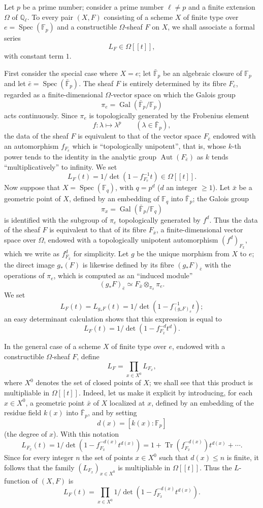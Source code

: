 \documentclass[11pt]{article}
\DeclareMathOperator{\Spec}{Spec}
\providecommand{\Gal}{\operatorname{Gal}}
\providecommand{\Tr}{\operatorname{Tr}}
\providecommand{\Tr}{\operatorname{Tr}}
\providecommand{\Tr}{\operatorname{Tr}}
\providecommand{\Aut}{\operatorname{Aut}}
\providecommand{\Tr}{\operatorname{Tr}}
\providecommand{\Spec}{\operatorname{Spec}}
\providecommand{\Spec}{\operatorname{Spec}}
\providecommand{\Aut}{\operatorname{Aut}}
\providecommand{\Spec}{\operatorname{Spec}}
\providecommand{\Tr}{\operatorname{Tr}}
\providecommand{\Spec}{\operatorname{Spec}}
\providecommand{\Gal}{\operatorname{Gal}}
\begin{document}
Let $p$ be a prime number; consider a prime number $\ell\ne p$ and a finite extension $\Omega$ of $\mathbb Q_\ell$. To every pair $(X,F)$ consisting of a scheme $X$ of finite type over $e=\Spec(\mathbb F_p)$ and a constructible $\Omega$-sheaf $F$ on $X$, we shall associate a formal series
\[
L_F\in\Omega[[t]],
\]
with constant term $1$.


First consider the special case where $X=e$; let $\bar{\mathbb F}_p$ be an algebraic closure of $\mathbb F_p$ and let $\bar e=\Spec(\bar{\mathbb F}_p)$. The sheaf $F$ is entirely determined by its fibre $F_{\bar e}$, regarded as a finite-dimensional $\Omega$-vector space on which the Galois group
\[
\pi_e=\Gal(\bar{\mathbb F}_p/\mathbb F_p)
\]
acts continuously. Since $\pi_e$ is topologically generated by the Frobenius element
\[
f:\lambda\longmapsto\lambda^p\qquad(\lambda\in\bar{\mathbb F}_p),
\]
the data of the sheaf $F$ is equivalent to that of the vector space $F_{\bar e}$ endowed with an automorphism $f_{F_{\bar e}}$ which is ``topologically unipotent'', that is, whose $k$-th power tends to the identity in the analytic group $\Aut(F_{\bar e})$ as $k$ tends ``multiplicatively'' to infinity. We set
\[
L_F(t)=1/\det(1-f_{F_{\bar e}}^{-1}t)\in\Omega[[t]].
\]
Now suppose that $X=\Spec(\mathbb F_q)$, with $q=p^d$ ($d$ an integer $\ge1$). Let $\bar x$ be a geometric point of $X$, defined by an embedding of $\mathbb F_q$ into $\bar{\mathbb F}_p$; the Galois group
\[
\pi_x=\Gal(\bar{\mathbb F}_p/\mathbb F_q)
\]
is identified with the subgroup of $\pi_e$ topologically generated by $f^d$. Thus the data of the sheaf $F$ is equivalent to that of its fibre $F_{\bar x}$, a finite-dimensional vector space over $\Omega$, endowed with a topologically unipotent automorphism $(f^d)_{F_{\bar x}}$, which we write as $f^d_{F_{\bar x}}$ for simplicity. Let $g$ be the unique morphism from $X$ to $e$; the direct image $g_*(F)$ is likewise defined by its fibre $(g_*F)_{\bar e}$ with the operations of $\pi_e$, which is computed as an ``induced module''
\[
(g_*F)_{\bar e}\simeq F_{\bar x}\otimes_{\pi_x}\pi_e.
\]
We set
\[
L_F(t)=L_{g_*F}(t)=1/\det(1-f^{-1}_{(g_*F)_{\bar e}}t);
\]
an easy determinant calculation shows that this expression is equal to
\[
L_F(t)=1/\det(1-f^{-d}_{F_{\bar x}}t^d).
\]

In the general case of a scheme $X$ of finite type over $e$, endowed with a constructible $\Omega$-sheaf $F$, define
\[
L_F=\prod_{x\in X^0}L_{F_x},
\]
where $X^0$ denotes the set of closed points of $X$; we shall see that this product is multipliable in $\Omega[[t]]$. Indeed, let us make it explicit by introducing, for each $x\in X^0$, a geometric point $\bar x$ of $X$ localized at $x$, defined by an embedding of the residue field $k(x)$ into $\bar{\mathbb F}_p$, and by setting
\[
d(x)=[k(x):\mathbb F_p]
\]
(the degree of $x$). With this notation
\[
L_{F_x}(t)=1/\det(1-f_{F_{\bar x}}^{-d(x)}t^{d(x)})
 =1+\Tr(f_{F_{\bar x}}^{-d(x)})t^{d(x)}+\cdots .
\]
Since for every integer $n$ the set of points $x\in X^0$ such that $d(x)\le n$ is finite, it follows that the family $(L_{F_x})_{x\in X^0}$ is multipliable in $\Omega[[t]]$. Thus the $L$-function of $(X,F)$ is
\[
L_F(t)=\prod_{x\in X^0}1/\det(1-f_{F_{\bar x}}^{-d(x)}t^{d(x)}).
\]
\end{document}
